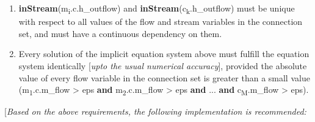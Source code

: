 \documentclass[10pt,a4paper]{report}
\renewcommand{\labelenumi}{\arabic{enumi}.}
\begin{document}
\begin{enumerate}
\def\labelenumi{\arabic{enumi}.}
\item
  \textbf{inStream}(m\textsubscript{i}.c.h\_outflow) and
  \textbf{inStream}(c\textsubscript{k}.h\_outflow) must be unique with
  respect to all values of the flow and stream variables in the
  connection set, and must have a continuous dependency on them.
\item
  Every solution of the implicit equation system above must fulfill the
  equation system identically {[}\emph{upto the usual numerical
  accuracy}{]}, provided the absolute value of every flow variable in
  the connection set is greater than a small value
  (\textbar{}m\textsubscript{1}.c.m\_flow\textbar{} \textgreater{} eps
  \textbf{and} \textbar{}m\textsubscript{2}.c.m\_flow\textbar{}
  \textgreater{} eps \textbf{and} ... \textbf{and}
  \textbar{}c\textsubscript{M}.m\_flow\textbar{} \textgreater{} eps).
\end{enumerate}

{[}\emph{Based on the above requirements, the following implementation
is recommended:}
\end{document}
